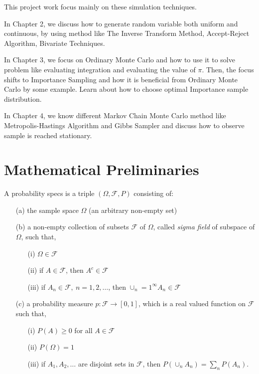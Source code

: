 This project work focus mainly on these simulation techniques.

In Chapter 2, we discuss how to generate random variable both
uniform and continuous, by using method like The Inverse Transform Method, 
Accept-Reject Algorithm, Bivariate Techniques.

In Chapter 3, we focus on Ordinary Monte Carlo and how to use it to solve problem like evaluating integration and evaluating the value of $\pi$.
Then, the focus shifts to Importance Sampling and how it is beneficial
from Ordinary Monte Carlo by some example. Learn about how to choose 
optimal Importance sample distribution.

In Chapter 4, we know different Markov Chain Monte Carlo method like Metropolis-Hastings Algorithm and Gibbs Sampler and discuss how to observe sample is reached stationary. 

\section{Mathematical Preliminaries}

\begin{definition}
	A probability specs is a triple $(\Omega, \mathcal{F}, P)$ consisting of:
	\begin{enumerate}
		\item[(a)] the sample space $\Omega$ (an arbitrary non-empty set)
		\item[(b)] a non-empty collection of subsets $\mathcal{F} $ of $ \Omega $,
		      called \textit{sigma field} of subspace of $ \Omega $, 
		      such that,
		      \begin{itemize}
			      \item[(i)] $ \Omega \in \mathcal{F} $
			      \item[(ii)] if $ A \in \mathcal{F} $, then $ A^{c}\in \mathcal{F}  $
			      \item [(iii)] if $ A_n\in \mathcal{F},\ n=1,2,\ldots $, then $ \cup_n=1^{\infty}A_n \in \mathcal{F}  $
		      \end{itemize}
		\item [(c)] a probability measure $ p:\mathcal{F}\to [0,1] $, which is a real valued function on $ \mathcal{F} $
		      such that,
		      \begin{itemize}
			      \item [(i)] $ P(A) \ge 0 $ for all $ A\in \mathcal{F} $
			      \item [(ii)] $ P(\Omega) = 1 $
			      \item [(iii)] if $ A_1,A_2,\ldots $ are disjoint sets in $ \mathcal{F} $, then $ P(\cup_n A_n) = \sum_{n} P(A_n)  $.
		      \end{itemize}
	\end{enumerate}
\end{definition}

